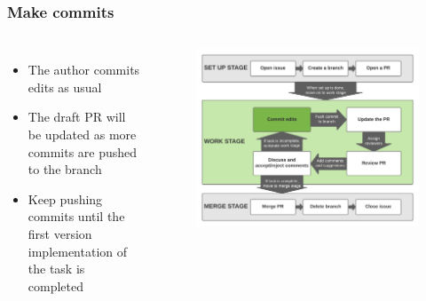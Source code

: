 \documentclass[aspectratio=169]{beamer} %
\begin{document}
\begin{frame}
	\frametitle{Make commits}
	\begin{columns}[c]
		
		\begin{itemize}
			\setlength\itemsep{1em}
			\item The author commits edits as usual
			\item The draft PR will be updated as more commits are pushed to the branch		
			\item Keep pushing commits until the first version implementation of the task is completed
		\end{itemize}
		
		\vspace{-.75cm}
		\begin{figure}
			\centering
			\includegraphics[width=\textwidth]{./img/branch-pr-merge-cycle-S2-1.png}
		\end{figure}
		
	\end{columns}
\end{frame}
\end{document}
